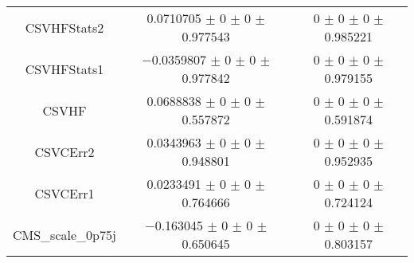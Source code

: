 \begin{table}
\begin{tabular}{ccc}
CSVHFStats2 	& \num{0.0710705} $\pm$ \num{0} $\pm$ \num{0} $\pm$ \num{0.977543} 	& \num{0} $\pm$ \num{0} $\pm$ \num{0} $\pm$ \num{0.985221}\\
CSVHFStats1 	& \num{-0.0359807} $\pm$ \num{0} $\pm$ \num{0} $\pm$ \num{0.977842} 	& \num{0} $\pm$ \num{0} $\pm$ \num{0} $\pm$ \num{0.979155}\\
CSVHF 	& \num{0.0688838} $\pm$ \num{0} $\pm$ \num{0} $\pm$ \num{0.557872} 	& \num{0} $\pm$ \num{0} $\pm$ \num{0} $\pm$ \num{0.591874}\\
CSVCErr2 	& \num{0.0343963} $\pm$ \num{0} $\pm$ \num{0} $\pm$ \num{0.948801} 	& \num{0} $\pm$ \num{0} $\pm$ \num{0} $\pm$ \num{0.952935}\\
CSVCErr1 	& \num{0.0233491} $\pm$ \num{0} $\pm$ \num{0} $\pm$ \num{0.764666} 	& \num{0} $\pm$ \num{0} $\pm$ \num{0} $\pm$ \num{0.724124}\\
CMS\_scale\_0p75j 	& \num{-0.163045} $\pm$ \num{0} $\pm$ \num{0} $\pm$ \num{0.650645} 	& \num{0} $\pm$ \num{0} $\pm$ \num{0} $\pm$ \num{0.803157}\\
\bottomrule
\end{tabular}
\end{table}